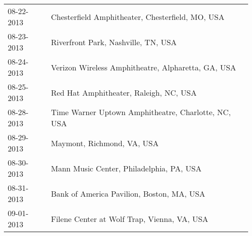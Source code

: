 \begin{supertabular}{ll}
 08-22-2013 &     Chesterfield Amphitheater, Chesterfield, MO, USA \\
 08-23-2013 &                  Riverfront Park, Nashville, TN, USA \\
 08-24-2013 &   Verizon Wireless Amphitheatre, Alpharetta, GA, USA \\
 08-25-2013 &               Red Hat Amphitheater, Raleigh, NC, USA \\
 08-28-2013 &  Time Warner Uptown Amphitheatre, Charlotte, NC, USA \\
 08-29-2013 &                           Maymont, Richmond, VA, USA \\
 08-30-2013 &             Mann Music Center, Philadelphia, PA, USA \\
 08-31-2013 &            Bank of America Pavilion, Boston, MA, USA \\
 09-01-2013 &          Filene Center at Wolf Trap, Vienna, VA, USA \\
\end{supertabular}
